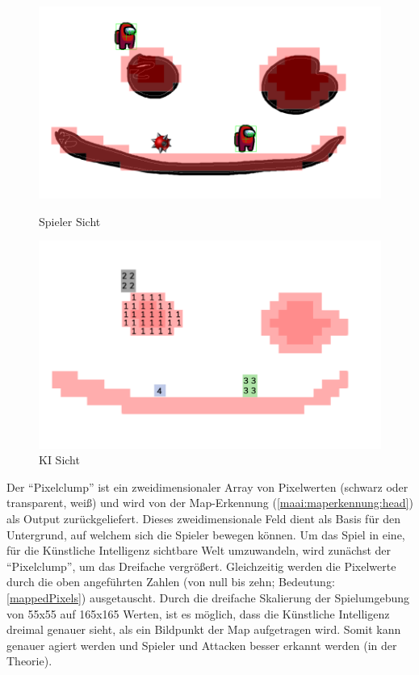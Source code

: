 \begin{figure}[H]
    \centering
    \begin{minipage}[t]{0.45\linewidth}
        \centering
        \includegraphics[width=\linewidth]{pics/ai/newView.png}
        \caption{Spieler Sicht}
        \label{maai:ai:newView}
    \end{minipage}
    \hfill
    \begin{minipage}[t]{0.45\linewidth}
        \centering
        \includegraphics[width=\linewidth]{pics/ai/KIView.png}
        \caption{KI Sicht}
        \label{maai:ai:KIView}
    \end{minipage}
\end{figure}

Der ``Pixelclump'' ist ein zweidimensionaler Array von Pixelwerten (schwarz oder transparent, weiß) und wird von der Map-Erkennung (\ref{maai:maperkennung:head}) als Output zurückgeliefert. Dieses zweidimensionale Feld dient als Basis für den Untergrund, auf welchem sich die Spieler bewegen können. Um das Spiel in eine, für die Künstliche Intelligenz sichtbare Welt umzuwandeln, wird zunächst der ``Pixelclump'', um das Dreifache vergrößert. Gleichzeitig werden die Pixelwerte durch die oben angeführten Zahlen (von null bis zehn; Bedeutung: \ref{mappedPixels}) ausgetauscht. Durch die dreifache Skalierung der Spielumgebung von 55x55 auf 165x165 Werten, ist es möglich, dass die Künstliche Intelligenz dreimal genauer sieht, als ein Bildpunkt der Map aufgetragen wird. Somit kann genauer agiert werden und Spieler und Attacken besser erkannt werden (in der Theorie).

